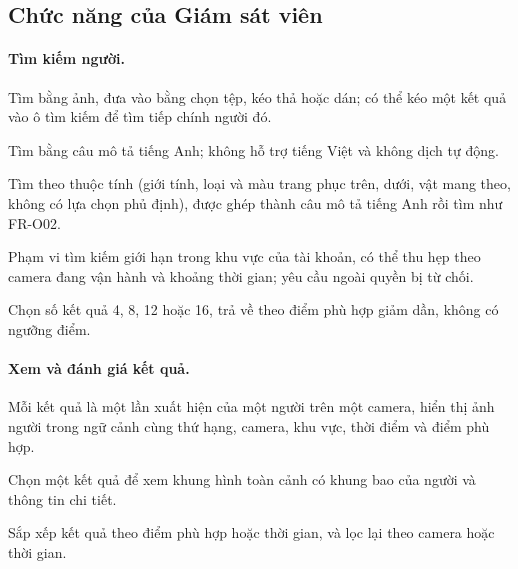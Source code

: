 \subsection{Chức năng của Giám sát viên}
\label{sec:4.2.3}

\paragraph{Tìm kiếm người.}
\begin{reqlist}
    \item[FR-O01] Tìm bằng ảnh, đưa vào bằng chọn tệp, kéo thả hoặc dán; có thể kéo một kết quả vào ô tìm kiếm để tìm tiếp chính người đó.
    \item[FR-O02] Tìm bằng câu mô tả tiếng Anh; không hỗ trợ tiếng Việt và không dịch tự động.
    \item[FR-O03] Tìm theo thuộc tính (giới tính, loại và màu trang phục trên, dưới, vật mang theo, không có lựa chọn phủ định), được ghép thành câu mô tả tiếng Anh rồi tìm như FR-O02.
    \item[FR-O04] Phạm vi tìm kiếm giới hạn trong khu vực của tài khoản, có thể thu hẹp theo camera đang vận hành và khoảng thời gian; yêu cầu ngoài quyền bị từ chối.
    \item[FR-O05] Chọn số kết quả 4, 8, 12 hoặc 16, trả về theo điểm phù hợp giảm dần, không có ngưỡng điểm.
\end{reqlist}

\paragraph{Xem và đánh giá kết quả.}
\begin{reqlist}
    \item[FR-O06] Mỗi kết quả là một lần xuất hiện của một người trên một camera, hiển thị ảnh người trong ngữ cảnh cùng thứ hạng, camera, khu vực, thời điểm và điểm phù hợp.
    \item[FR-O07] Chọn một kết quả để xem khung hình toàn cảnh có khung bao của người và thông tin chi tiết.
    \item[FR-O08] Sắp xếp kết quả theo điểm phù hợp hoặc thời gian, và lọc lại theo camera hoặc thời gian.
\end{reqlist}

